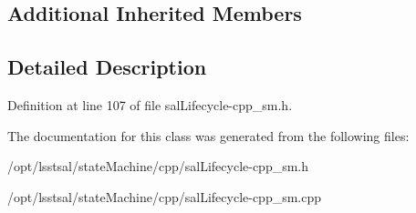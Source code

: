 \subsection*{Additional Inherited Members}


\subsection{Detailed Description}


Definition at line 107 of file sal\-Lifecycle-\/cpp\-\_\-sm.\-h.



The documentation for this class was generated from the following files\-:\begin{DoxyCompactItemize}
\item 
/opt/lsstsal/state\-Machine/cpp/sal\-Lifecycle-\/cpp\-\_\-sm.\-h\item 
/opt/lsstsal/state\-Machine/cpp/sal\-Lifecycle-\/cpp\-\_\-sm.\-cpp\end{DoxyCompactItemize}
